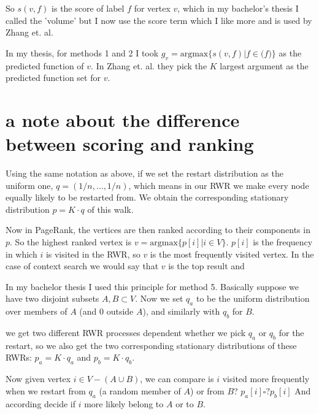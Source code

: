 \documentclass[10pt]{article}
\theoremstyle{definition}
\theoremstyle{remark}
\theoremstyle{plain}
\begin{document}
So $s(v,f)$ is the score of label $f$ for vertex $v$, which in my
bachelor's thesis I called the 'volume' but I now use the score term
which I like more and is used by Zhang et. al.

In my thesis, for methods 1 and 2 I took 
$g_v = \text{argmax}\{s(v,f) | f \in \mathcal(f)\}$ as the predicted
function of $v$. In Zhang et. al. they pick the $K$ largest argument as the
predicted function set for $v$.

\section{a note about the difference between scoring and ranking}
Using the same notation as above, if we set the restart distribution
as the uniform one, $q = (1/n, \dots , 1/n)$, which means in our
RWR we make every node equally likely to be restarted from.
We obtain the corresponding stationary distribution $p = K \cdot q$
of this walk.

Now in PageRank, the vertices are then ranked according to their 
components in $p$. So the highest ranked vertex is
$v = \text{argmax}\{p[i] | i \in V \}$.
$p[i]$ is the frequency in which $i$ is visited in the RWR, so $v$
is the most frequently visited vertex.
In the case of 
context search we would say that $v$ is the top result and 

In my bachelor thesis I used this principle for method 5.
Basically suppose we have two disjoint subsets 
$A, B \subset V$. Now we set $q_a$ to be the uniform distribution
over members of $A$ (and $0$ outside $A$), and similarly with $q_b$
for $B$.

we get two different RWR processes dependent whether we pick $q_a$
or $q_b$ for the restart, so we also get the two corresponding 
stationary distributions of these RWRs:
$p_a = K \cdot q_a$ and $p_b = K \cdot q_b$.

Now given vertex $i \in V - (A \cup B)$, we can compare
is $i$ visited more frequently when we restart from $q_a$
(a random member of $A$) or from $B$?
$p_a[i] \square ? p_b[i]$
And according decide if $i$ more likely belong to $A$ or to $B$.
\end{document}
